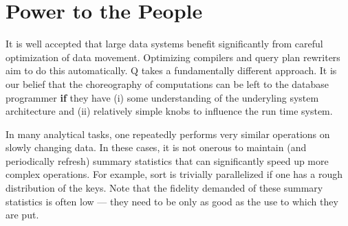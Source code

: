 \section{Power to the People}

It is well accepted that large data systems benefit significantly 
from careful optimization of data movement. Optimizing compilers and query plan
rewriters aim to do this automatically.
Q takes a fundamentally different approach. It is our belief that the
choreography of computations can be left to the database programmer {\bf if} 
they have (i) some understanding of the underyling
system architecture and (ii) relatively simple knobs to influence the run time
system.  

In many analytical tasks, one repeatedly performs very similar operations on slowly
changing data. In these cases, 
it is not onerous to maintain (and periodically refresh) summary statistics that
can significantly speed up more complex operations. For example, sort is
trivially parallelized if one has a rough distribution of the keys.
Note that the fidelity demanded of these summary statistics is often low ---
they need to be only as good as the use to which they are put. 


